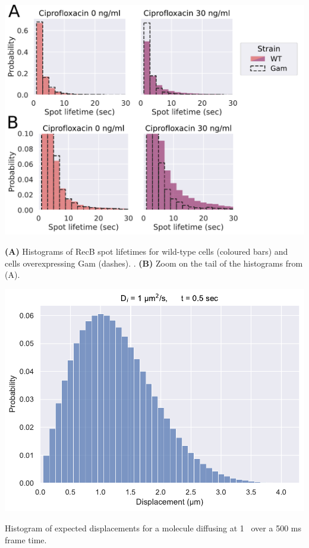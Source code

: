 \begin{suppfigure*}[htbp]
    \begin{center}
    \includegraphics[width=0.75\linewidth]{SI_Figures/Gam_lifetimes_vs_WT.pdf}
    \end{center}
    \caption{\textbf{(A)} Histograms of RecB spot lifetimes for wild-type cells (coloured bars) and cells overexpressing Gam (dashes). .  \textbf{(B)} Zoom on the tail of the histograms from (A).}
    \label{SIFig:Gam_RecB_lifetimes_vs_WT}
\end{suppfigure*}

\begin{suppfigure*}[htbp]
    \begin{center}
    \includegraphics[width=.8\textwidth]{SI_Figures/Displacements_distribution.pdf}
    \end{center}
    \caption{Histogram of expected displacements for a molecule diffusing at 1 \ums\ over a 500 ms frame time.}
    \label{SIFig:displacement_simul}
\end{suppfigure*}

